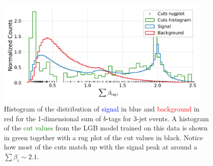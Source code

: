 \begin{figure}
  \includegraphics[width=0.95\textwidth, trim=10 10 10 20, clip]{figures/quarks/gtag_sum_method_njet=3-down_sample=1.00-ML_vars=vertex-selection=b-ejet_min=4-n_iter_RS_lgb=99-n_iter_RS_xgb=9-cdot_cut=0.90-version=19.pdf}
  \caption[1D LGB Model Cuts for 3-jets events]
          {Histogram of the distribution of \textcolor{blue}{signal} in blue and \textcolor{red}{background} in red for the 1-dimensional sum of $b$-tags for 3-jet events. A histogram of the \textcolor{green}{cut values} from the LGB model trained on this data is shown in green together with a rug plot of the cut values in black. Notice how most of the cuts match up with the signal peak at around a $\sum \beta_i \sim 2.1$.
          } 
  \label{fig:q:1d_sum_model_cuts_3j}
\end{figure}




